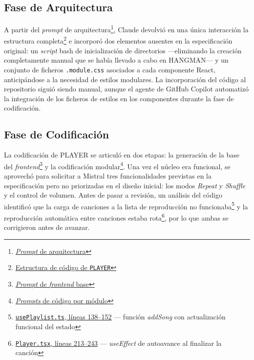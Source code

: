 \subsection{Fase de Arquitectura}

A partir del \textit{prompt} de arquitectura\footnote{\href{https://github.com/alu0101549491/TFG-Fabian-Gonzalez-Lence/blob/main/resources/prompts/2-MusicWebPlayer/1-Inicializacion/architecture.prompt.md}{\textit{Prompt} de arquitectura}}, Claude devolvió en una única interacción la estructura completa\footnote{\href{https://github.com/alu0101549491/TFG-Fabian-Gonzalez-Lence/blob/main/resources/project-structures/2-MusicWebPlayer.md}{Estructura de código de \texttt{PLAYER}}} e incorporó dos elementos ausentes en la especificación original: un \textit{script} bash de inicialización de directorios —eliminando la creación completamente manual que se había llevado a cabo en \ac{HANGMAN}— y un conjunto de ficheros \texttt{.module.css} asociados a cada componente React, anticipándose a la necesidad de estilos modulares. La incorporación del código al repositorio siguió siendo manual, aunque el agente de GitHub Copilot automatizó la integración de los ficheros de estilos en los componentes durante la fase de codificación.

\subsection{Fase de Codificación}

La codificación de \ac{PLAYER} se articuló en dos etapas: la generación de la base del \textit{frontend}\footnote{\href{https://github.com/alu0101549491/TFG-Fabian-Gonzalez-Lence/blob/main/resources/prompts/2-MusicWebPlayer/2-CodigoFrontend/frontend.prompt.md}{\textit{Prompt} de \textit{frontend} base}} y la codificación modular\footnote{\href{https://github.com/alu0101549491/TFG-Fabian-Gonzalez-Lence/tree/main/resources/prompts/2-MusicWebPlayer/3-CodigoPorModulo}{\textit{Prompts} de código por módulo}}.
Una vez el núcleo era funcional, se aprovechó para solicitar a Mistral tres funcionalidades previstas en la especificación pero no priorizadas en el diseño inicial: los modos \textit{Repeat} y \textit{Shuffle} y el control de volumen. Antes de pasar a revisión, un análisis del código identificó que la carga de canciones a la lista de reproducción no funcionaba\footnote{\href{https://github.com/alu0101549491/TFG-Fabian-Gonzalez-Lence/blob/main/projects/2-MusicWebPlayer/src/hooks/usePlaylist.ts\#L138-L152}{\texttt{usePlaylist.ts}, líneas 138--152} — función \textit{addSong} con actualización funcional del estado} y la reproducción automática entre canciones estaba rota\footnote{\href{https://github.com/alu0101549491/TFG-Fabian-Gonzalez-Lence/blob/main/projects/2-MusicWebPlayer/src/components/Player.tsx\#L213-L243}{\texttt{Player.tsx}, líneas 213--243} — \textit{useEffect} de autoavance al finalizar la canción}, por lo que ambas se corrigieron antes de avanzar.

